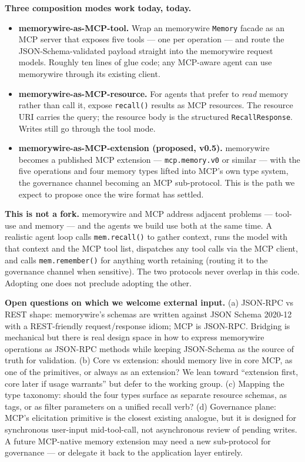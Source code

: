 \documentclass[11pt,letterpaper,twocolumn]{article}
\begin{document}
\textbf{Three composition modes work today, today.}

\begin{itemize}[leftmargin=*]
  \item \textbf{memorywire-as-MCP-tool.} Wrap an memorywire \texttt{Memory} facade as an MCP server that exposes five tools --- one per operation --- and route the JSON-Schema-validated payload straight into the memorywire request models. Roughly ten lines of glue code; any MCP-aware agent can use memorywire through its existing client.
  \item \textbf{memorywire-as-MCP-resource.} For agents that prefer to \emph{read} memory rather than call it, expose \texttt{recall()} results as MCP resources. The resource URI carries the query; the resource body is the structured \texttt{RecallResponse}. Writes still go through the tool mode.
  \item \textbf{memorywire-as-MCP-extension (proposed, v0.5).} memorywire becomes a published MCP extension --- \texttt{mcp.memory.v0} or similar --- with the five operations and four memory types lifted into MCP's own type system, the governance channel becoming an MCP sub-protocol. This is the path we expect to propose once the wire format has settled.
\end{itemize}

\textbf{This is not a fork.} memorywire and MCP address adjacent problems --- tool-use and memory --- and the agents we build use both at the same time. A realistic agent loop calls \texttt{mem.recall()} to gather context, runs the model with that context and the MCP tool list, dispatches any tool calls via the MCP client, and calls \texttt{mem.remember()} for anything worth retaining (routing it to the governance channel when sensitive). The two protocols never overlap in this code. Adopting one does not preclude adopting the other.

\textbf{Open questions on which we welcome external input.} (a) JSON-RPC vs REST shape: memorywire's schemas are written against JSON Schema 2020-12 with a REST-friendly request/response idiom; MCP is JSON-RPC. Bridging is mechanical but there is real design space in how to express memorywire operations as JSON-RPC methods while keeping JSON-Schema as the source of truth for validation. (b) Core vs extension: should memory live in core MCP, as one of the primitives, or always as an extension? We lean toward ``extension first, core later if usage warrants'' but defer to the working group. (c) Mapping the type taxonomy: should the four types surface as separate resource schemas, as tags, or as filter parameters on a unified recall verb? (d) Governance plane: MCP's elicitation primitive is the closest existing analogue, but it is designed for synchronous user-input mid-tool-call, not asynchronous review of pending writes. A future MCP-native memory extension may need a new sub-protocol for governance --- or delegate it back to the application layer entirely.
\end{document}
